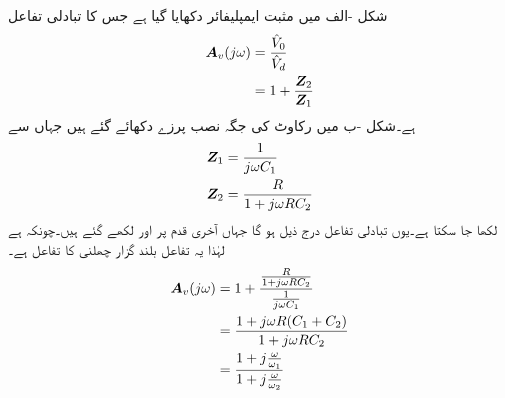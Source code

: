 شکل -الف میں مثبت ایمپلیفائر دکھایا گیا ہے جس کا تبادلی تفاعل
\begin{align*}
{\ensuremath{{\boldsymbol{A}}}}_v(j\omega)&=\frac{\hat{V}_0}{\hat{V}_d}\\
&=1+\frac{{{\boldsymbol{Z}}}_2}{{{\boldsymbol{Z}}}_1}
\end{align*}
ہے۔شکل -ب میں رکاوٹ کی جگہ نصب پرزے دکھائے گئے ہیں جہاں سے 
\begin{align*}
{\ensuremath{{\boldsymbol{Z}}}}_1&=\frac{1}{j\omega C_1}\\
{{\boldsymbol{Z}}}_2&=\frac{R}{1+j\omega R C_2}
\end{align*}
لکھا جا سکتا ہے۔یوں تبادلی تفاعل درج ذیل ہو گا جہاں آخری قدم پر  اور  لکھے گئے ہیں۔چونکہ  ہے لہٰذا یہ تفاعل بلند گزار چھلنی کا تفاعل ہے۔
\begin{align*}
{\ensuremath{{\boldsymbol{A}}}}_v(j\omega)&=1+\frac{\frac{R}{1+j\omega R C_2}}{\frac{1}{j\omega C_1}}\\
&=\frac{1+j\omega R(C_1+C_2)}{1+j\omega R C_2}\\
&=\frac{1+j\frac{\omega}{\omega_1} }{1+j\frac{\omega}{\omega_2}}
\end{align*}
%

